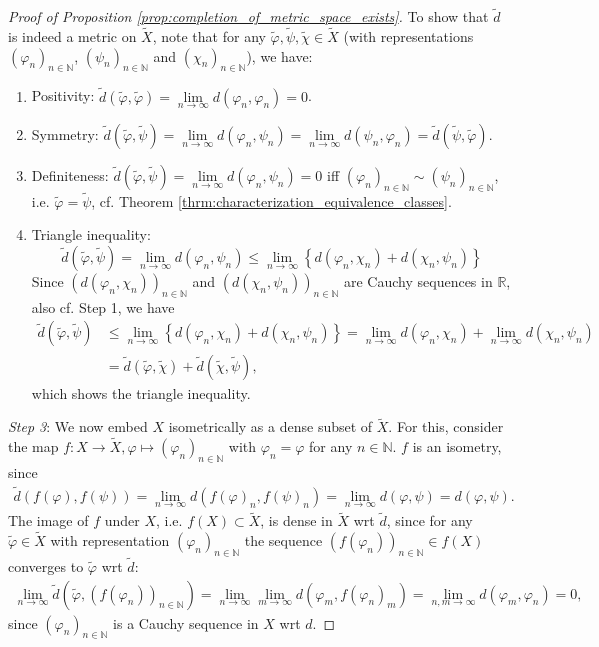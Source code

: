 \documentclass[12pt, a4paper]{article}
\numberwithin{equation}{section}
\theoremstyle{definition}
\theoremstyle{definition}
\newcommand{\seq}[1][\varphi]{\left( #1 \right)_{n \in \mathbb{N}}}
\begin{document}
\begin{proof}[Proof of Proposition \ref{prop:completion_of_metric_space_exists}]
		To show that $\tilde{d}$ is indeed a metric on $\tilde{X}$, note that for any $\tilde{\varphi}, \tilde{\psi}, \tilde{\chi}\in \tilde{X}$ (with representations $\seq[\varphi_n]$, $\seq[\psi_n]$ and $\seq[\chi_n]$), we have:
		\begin{enumerate}
			\item Positivity: $\tilde d\left(\tilde{\varphi}, \tilde{\varphi}\right) = \lim\limits_{n\to\infty} d(\varphi_n, \varphi_n) = 0$.
			\item Symmetry: $\tilde d\left(\tilde{\varphi}, \tilde{\psi}\right) = \lim\limits_{n\to\infty} d(\varphi_n, \psi_n) = \lim\limits_{n\to\infty} d(\psi_n, \varphi_n) = \tilde{d}\left(\tilde{\psi}, \tilde{\varphi}\right)$.
			\item Definiteness: $\tilde d\left(\tilde{\varphi}, \tilde{\psi}\right) = \lim\limits_{n\to\infty}d(\varphi_n, \psi_n) = 0$ iff $\seq[\varphi_n]\sim\seq[\psi_n]$, i.e. $\tilde{\varphi} = \tilde{\psi}$, cf. Theorem \ref{thrm:characterization_equivalence_classes}.
			\item Triangle inequality: $$\tilde{d}\left(\tilde{\varphi}, \tilde{\psi}\right) = \lim\limits_{n\to\infty}d(\varphi_n, \psi_n) \leq \lim\limits_{n\to\infty}\left\{d(\varphi_n, \chi_n) + d(\chi_n, \psi_n)\right\}$$ Since $\seq[d(\varphi_n, \chi_n)]$ and $\seq[d(\chi_n, \psi_n)]$ are Cauchy sequences in $\mathbb R$, also cf. Step 1, we have 
			\begin{align*}
				\tilde{d}\left(\tilde{\varphi}, \tilde{\psi}\right) &\leq \lim\limits_{n\to\infty}\left\{d(\varphi_n, \chi_n) + d(\chi_n, \psi_n)\right\} = \lim\limits_{n\to\infty}d(\varphi_n, \chi_n) + \lim\limits_{n\to\infty}d(\chi_n, \psi_n) 
				\\ &= \tilde{d}\left(\tilde{\varphi}, \tilde{\chi}\right) + \tilde{d}\left(\tilde{\chi}, \tilde{\psi}\right),
			\end{align*}
			which shows the triangle inequality.
		\end{enumerate}
		\textit{Step 3}: We now embed $X$ isometrically as a dense subset of $\tilde{X}$. For this, consider the map $f: X\to\tilde{X}, \varphi\mapsto \seq[\varphi_n]$ with $\varphi_n = \varphi$ for any $n\in\mathbb N$. $f$ is an isometry, since 
		\begin{align}
			\tilde{d}\left(f(\varphi), f(\psi)\right) = \lim\limits_{n\to\infty} d\left(f(\varphi)_n, f(\psi)_n\right) = \lim\limits_{n\to\infty}d(\varphi, \psi) = d(\varphi, \psi).
		\end{align}
		The image of $f$ under $X$, i.e. $f(X)\subset \tilde{X}$, is dense in $\tilde{X}$ wrt $\tilde{d}$, since for any $\tilde{\varphi}\in\tilde{X}$ with representation $\seq[\varphi_n]$ the sequence $\seq[f(\varphi_n)]\in f(X)$ converges to $\tilde{\varphi}$ wrt $\tilde{d}$:
		\begin{align}
			\lim\limits_{n\to\infty}\tilde{d}\left(\tilde{\varphi}, \seq[f(\varphi_n)]\right) = \lim\limits_{n\to\infty}\lim\limits_{m\to\infty}d(\varphi_m, f(\varphi_n)_m) = \lim\limits_{n,m\to\infty} d(\varphi_m, \varphi_n) = 0,
		\end{align}
		since $\seq[\varphi_n]$ is a Cauchy sequence in $X$ wrt $d$.
		

\end{proof}
\end{document}
